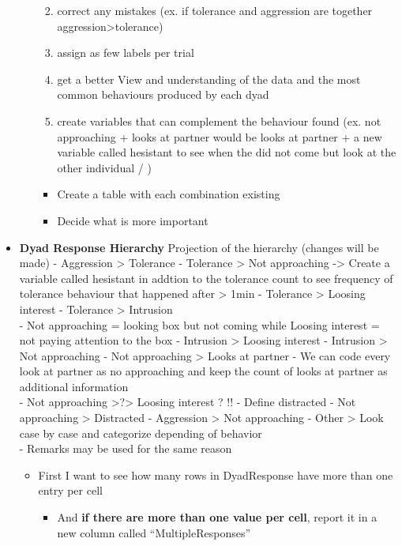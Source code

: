 \documentclass[
]{article}
\providecommand{\tightlist}{%
  \setlength{\itemsep}{0pt}\setlength{\parskip}{0pt}}
\begin{document}
\begin{itemize}
\begin{itemize}
    \begin{enumerate}
    \def\labelenumi{\arabic{enumi}.}
    \tightlist
    \item
      correct any mistakes (ex. if tolerance and aggression are together
      aggression\textgreater tolerance)
    \item
      assign as few labels per trial
    \item
      get a better View and understanding of the data and the most
      common behaviours produced by each dyad
    \item
      create variables that can complement the behaviour found (ex. not
      approaching + looks at partner would be looks at partner + a new
      variable called hesistant to see when the did not come but look at
      the other individual / )
    \end{enumerate}

    \begin{itemize}
    \item
      Create a table with each combination existing
    \item
      Decide what is more important
    \end{itemize}
  \end{itemize}
\item
  \textbf{Dyad Response Hierarchy} Projection of the hierarchy (changes
  will be made) - Aggression \textgreater{} Tolerance - Tolerance
  \textgreater{} Not approaching -\textgreater{} Create a variable
  called hesistant in addtion to the tolerance count to see frequency of
  tolerance behaviour that happened after \textgreater{} 1min -
  Tolerance \textgreater{} Loosing interest - Tolerance \textgreater{}
  Intrusion\\
  - Not approaching = looking box but not coming while Loosing interest
  = not paying attention to the box - Intrusion \textgreater{} Loosing
  interest - Intrusion \textgreater{} Not approaching - Not approaching
  \textgreater{} Looks at partner - We can code every look at partner as
  no approaching and keep the count of looks at partner as additional
  information\\
  - Not approaching \textgreater?\textgreater{} Loosing interest ? !! -
  Define distracted - Not approaching \textgreater{} Distracted -
  Aggression \textgreater{} Not approaching - Other \textgreater{} Look
  case by case and categorize depending of behavior\\
  - Remarks may be used for the same reason

  \begin{itemize}
  \item
    First I want to see how many rows in DyadResponse have more than one
    entry per cell

    \begin{itemize}
    \tightlist
    \item
      And \textbf{if there are more than one value per cell}, report it
      in a new column called ``MultipleResponses''
    \end{itemize}
  \end{itemize}
\end{itemize}
\end{document}
